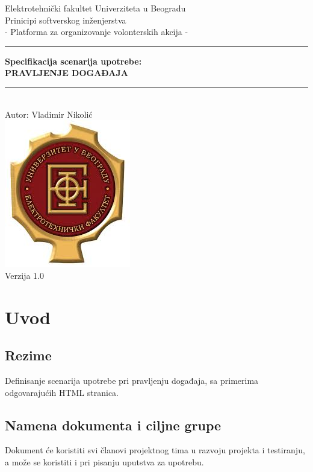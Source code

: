 \documentclass[11pt,a4paper]{article}
\begin{document}
\begin{titlepage}

\centering
\textnormal{\large Elektrotehnički fakultet Univerziteta u Beogradu}\\[0.1cm]
\textnormal{\large Prinicipi softverskog inženjerstva}\\[3cm]

\textnormal{\normalsize - Platforma za organizovanje volonterskih akcija -}\\\vspace{-5mm}
\rule{\textwidth}{0.4pt}
{\huge \bfseries Specifikacija scenarija upotrebe:\\ 
PRAVLJENJE DOGAĐAJA\par}\vspace{-1mm}
\rule{\textwidth}{0.4pt}\\\vspace{1mm}
\textnormal{\large Autor: Vladimir Nikolić}\\[6cm]

\includegraphics[scale=0.5]{logo.jpg}\\
\vfill
\textnormal{\normalsize Verzija 1.0}\\

\end{titlepage}

\tableofcontents

\newpage

\section{Uvod}
\subsection{Rezime}
Definisanje scenarija upotrebe pri pravljenju događaja, sa primerima odgovarajućih HTML stranica.
\subsection{Namena dokumenta i ciljne grupe}
Dokument će koristiti svi članovi projektnog tima u razvoju projekta i testiranju, a može se koristiti i pri pisanju uputstva za upotrebu.
\end{document}
